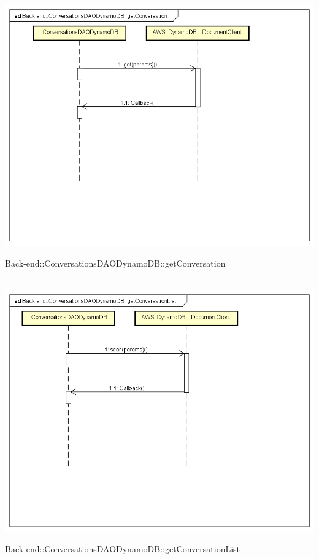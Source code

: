 \\ \includegraphics[width=\textwidth,height=\textheight,keepaspectratio]{images/diagrams/back-end/Ufficial_Backend/Back-end__ConversationsDAODynamoDB__getConversation.png} 	\caption{Back-end::ConversationsDAODynamoDB::getConversation}
\\ \includegraphics[width=\textwidth,height=\textheight,keepaspectratio]{images/diagrams/back-end/Ufficial_Backend/Back-end__ConversationsDAODynamoDB__getConversationList.png} 	\caption{Back-end::ConversationsDAODynamoDB::getConversationList}
